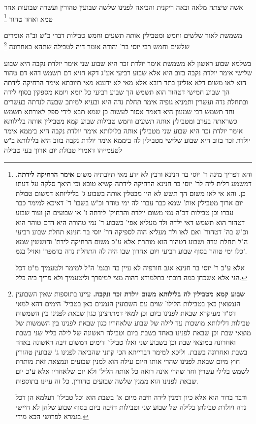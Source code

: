 \documentclass[12pt, openany]{book}
\newcommand{\footnotecomment}[1]{\footnote{#1}}
\newcommand{\commenta}[1]{\footnotecomment{#1}}
\begin{document}
{אשה שיצתה מלאה ובאה ריקנית והביאה לפנינו שלשה שבועין טהורין ועשרה שבועות אחד טמא ואחד טהור
\commenta{ והא דפריך מינה ר' יוסי בר חנינא ורבין לא ידע מאי תיובתיה משום \textbf{אימר הרחיקה לידתה.}  דמשמע דלית ליה לר' יוסי בר חנינא הרחיקה לידתה קשיא טובא וכי היאך סלקה על דעתו כן. והא אי לאו משום הך תשש לא היו מבטלין אותה בשבוע ג' בליליותא דמשום טבולת יום ארוך מטבילין אות' שמא כבר עברו לה ימי טוהר וכ"ש בשבו' ד' דאיכא למימר כבר עברו וכן טבילות דב"ה נמי משום יולדת והרחיק' לידתה ז' או שבועים הן ועוד שבוע דטהור הוא תשמש דאי ילדה ולד מעליא אפי' בשבוע ד' נמי טהורה היא דדם טוהר הוא וכ"ש בה' דטהור' ואם לאו ולד מעליא הוה לספיקה דר' יוסי בר חנינא תחלת שבוע רביעי ה"ל תחלת ונדה ושבוע דטהור הוא מותרת אלא ע"כ משום הרחיקה לידת' וחוששין שמא כלו ימי טוהר בסוף שבוע רביעי ויום אחרון שבו היה לה התחלת נדה כדמפר' ואזיל בגמ'.\par  אלא ע"כ ר' יוסי בר חנינא אגב חורפיה לא עיין בה ובגמ' ה"ל למימר ולטעמיך מ"ט דכל הני אלא אשכחן כמה דוכתי בתלמודא דהוה מצי למיפרך וליטעמיך ולא פריך ביה כלל. }

משמשת לאור שלשים וחמש ומטבילין אותה תשעים וחמש טבילות דברי ב"ש  וב"ה אומרים  שלשים וחמש  רבי יוסי בר' יהודה אומר דיה לטבילה שתהא באחרונה 
\commenta{\textbf{שבוע קמא מטבילין לה בלילותא משום יולדת זכר ונקבה.}  עיינו בתוספות שאין השבועין הנמצאין כאן בטבילות הלילו' שוים עם השבועין הנמנים כאן בטביל' הימים דהא למאי דס"ד מעיקרא שבאת לפנינו ביום וכן למאי דמתרצינן כגון שבאת לפנינו בין השמשות טבילות דלילותא מושכות עד לילה של שבוע שלאחריו כגון שבאת לפנינו בין השמשות של מוצאי שבת וכן שבאת לפנינו באחד בשבת ביום וטבילה ראשונה של לילה בליל שני בשבת ואחרונה במוצאי שבת וכן בשבוע שני ואלו טבילו' דימים דמשום זיבה ראשונה באחד בשבת ואחרונה בשבת. וליכא למימר דברייתא הכי קתני שהביאה לפנינו ג' שבועין טהורין חוץ מיום שבאת לפנינו שהרי אותו היום עילה הוא למנין שבועים ונמצאת זאת מותרת לשמש בלילי עשרין וחד שהרי אינה רואה כל אותה הליל' ולא יום שלאחריו אלא ע"כ יום שבאת לפנינו הוא ממנין שלשה שבועים טהורין. כל זה עיינו בתוספות.\par ודבר ברור הוא אלא כיון דמנין לידה וזיבה מיום א' בשבת הוא וכל טבילו' דעלמא הן דכל נדה ויולדת טבילתן בלילה של שבוע שני וטבילות דזיבה ביום בסוף שבוע שלהן לא חיישי בגמרא לפרושי הכא מידי. }

בשלמא שבוע ראשון לא משמשת אימר  יולדת זכר היא שבוע שני אימר  יולדת נקבה היא
שבוע שלישי אימר  יולדת נקבה בזוב היא
אלא שבוע רביעי אע"ג דקא חזיא דם תשמש דהא דם טהור  הוא לאו משום דלא אזלינן בתר רובא 
אלא מאי לא ידענא מאי תיובתא  אימר  הרחיקה לידתה 
הך שבוע חמישי דטהור הוא תשמש 
הך שבוע רביעי כל יומא ויומא מספקין בסוף לידה ובתחלת נדה  ועשרין ותמניא גופיה אימר  תחלת נדה היא ובעיא למיתב שבעה לנדתה 
בעשרים וחד תשמש 
רבי שמעון היא דאמר  אסור לעשות כן שמא תבא לידי ספק  לאורתא תשמש  כשראתה בערב 
ומטבילין אותה תשעים וחמש טבילות  שבוע קמא מטבילין אותה בלילותא  אימר  יולדת זכר היא 
שבוע שני מטבילין אותה בלילותא אימר  יולדת נקבה היא ביממא אימר  יולדת זכר בזוב היא 
שבוע שלישי מטבילין לה ביממא אימר  יולדת נקבה בזוב היא
בלילותא ב"ש לטעמייהו דאמרי  טבולת יום ארוך בעי טבילה}
\end{document}
